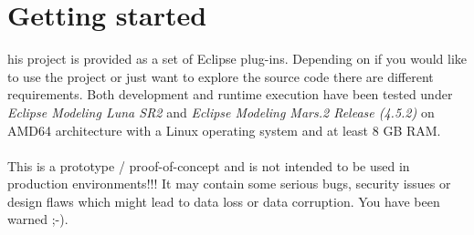 \section{Getting started}
his project is provided as a set of Eclipse plug-ins.
Depending on if you would like to use the project or just want to explore 
the source code there are different requirements. 
Both development and runtime execution have been tested under {\it Eclipse Modeling Luna SR2} 
and {\it Eclipse Modeling Mars.2 Release (4.5.2)} on AMD64 architecture with a Linux operating system 
and at least 8 GB RAM. 
\\ \ \\
\warning{}
This is a prototype / proof-of-concept and is not intended to be used in production environments!!!
It may contain some serious bugs, security issues or design flaws which might lead to data loss or data corruption. 
You have been warned ;-). 

